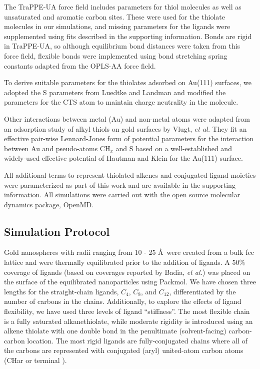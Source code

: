 \documentclass[aps,jcp,preprint,showpacs,superscriptaddress,groupedaddress]{revtex4-1}  %
\begin{document}
The TraPPE-UA force field includes parameters for thiol
molecules\cite{TraPPE-UA.thiols} as well as unsaturated and aromatic
carbon sites.\cite{TraPPE-UA.alkylbenzenes} These were used for the
thiolate molecules in our simulations, and missing parameters for the
ligands were supplemented using fits described in the supporting
information.  Bonds are rigid in TraPPE-UA, so although equilibrium
bond distances were taken from this force field, flexible bonds were
implemented using bond stretching spring constants adapted from the
OPLS-AA force field.\cite{Jorgensen:1996sf}

To derive suitable parameters for the thiolates adsorbed on Au(111)
surfaces, we adopted the S parameters from Luedtke and
Landman\cite{landman:1998} and modified the parameters for the CTS
atom to maintain charge neutrality in the molecule.

Other interactions between metal (Au) and non-metal atoms were adapted
from an adsorption study of alkyl thiols on gold surfaces by Vlugt,
\textit{et al.}\cite{vlugt:cpc2007154} They fit an effective pair-wise
Lennard-Jones form of potential parameters for the interaction between
Au and pseudo-atoms CH$_x$ and S based on a well-established and
widely-used effective potential of Hautman and Klein for the Au(111)
surface.\cite{hautman:4994}

All additional terms to represent thiolated alkenes and conjugated
ligand moieties were parameterized as part of this work and are
available in the supporting information.  All simulations were carried
out with the open source molecular dynamics package,
OpenMD.\cite{openmd,OOPSE}


\subsection{Simulation Protocol}

Gold nanospheres with radii ranging from 10 - 25 \AA\ were created
from a bulk fcc lattice and were thermally equilibrated prior to the
addition of ligands. A 50\% coverage of ligands (based on coverages
reported by Badia, \textit{et al.}\cite{Badia1996:2}) was placed on
the surface of the equilibrated nanoparticles using
Packmol\cite{packmol}. We have chosen three lengths for the
straight-chain ligands, $C_4$, $C_8$, and $C_{12}$, differentiated by
the number of carbons in the chains.  Additionally, to explore the
effects of ligand flexibility, we have used three levels of ligand
``stiffness''.  The most flexible chain is a fully saturated
alkanethiolate, while moderate rigidity is introduced using an alkene
thiolate with one double bond in the penultimate (solvent-facing)
carbon-carbon location.  The most rigid ligands are fully-conjugated
chains where all of the carbons are represented with conjugated (aryl)
united-atom carbon atoms (CHar or terminal ).
\end{document}
